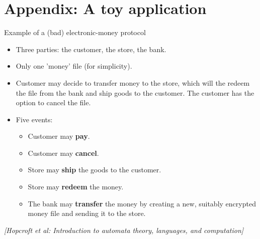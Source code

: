 \documentclass[handout]{beamer}
\begin{document}
\section{Appendix: A toy application}


\begin{frame}{Example of a (bad) electronic-money protocol}

    \begin{itemize}
        \item Three parties: the customer, the store, the bank.
        \item Only one 'money' file (for simplicity).    
        \item Customer may decide to transfer money to the store, which will the redeem the file from the bank and ship goods to the customer. The customer has the option to cancel the file.        
        \item Five events:
        \begin{itemize}
            \item Customer may \textbf{pay}.
            \item Customer may \textbf{cancel}.
            \item Store may \textbf{ship} the goods to the customer.
            \item Store may \textbf{redeem} the money.
            \item The bank may \textbf{transfer} the money by creating a new, suitably encrypted money file and sending it to the store.
        \end{itemize}
    \end{itemize}

    {\footnotesize\it [Hopcroft et al: Introduction to automata theory, languages, and computation]}
    
\end{frame}
\end{document}

